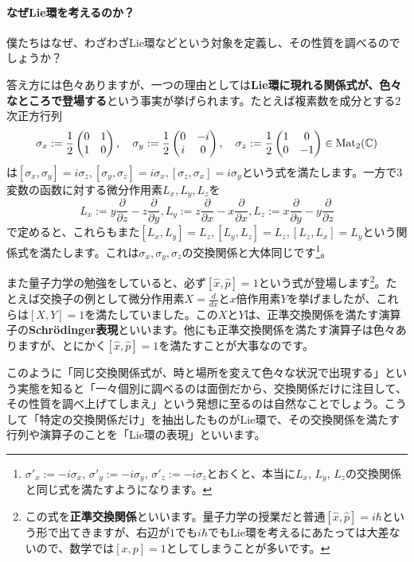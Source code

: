 \paragraph{なぜLie環を考えるのか？}

僕たちはなぜ、わざわざLie環などという対象を定義し、その性質を調べるのでしょうか？

答え方には色々ありますが、一つの理由としては\textbf{Lie環に現れる関係式が、色々なところで登場する}という事実が挙げられます。たとえば複素数を成分とする$2$次正方行列
\[
\sigma_x := 
\frac{1}{2}
\begin{pmatrix}
0 & 1 \\
1 & 0
\end{pmatrix}, \quad
\sigma_y := 
\frac{1}{2}
\begin{pmatrix}
0 & -i \\
i & 0 
\end{pmatrix}, \quad
\sigma_z := 
\frac{1}{2}
\begin{pmatrix}
1 & 0 \\
0 & -1
\end{pmatrix}
\in \operatorname{Mat}_2(\mathbb{C})
\]
は$[\sigma_x, \sigma_y] = i\sigma_z, [\sigma_y, \sigma_z] = i\sigma_x, [\sigma_z, \sigma_x] = i\sigma_y$という式を満たします。一方で$3$変数の函数に対する微分作用素$L_x, L_y, L_z$を
\[
L_x := y\frac{\partial}{\partial z} - z\frac{\partial}{\partial y}, 
L_y := z\frac{\partial}{\partial x} - x\frac{\partial}{\partial x}, 
L_z := x\frac{\partial}{\partial y} - y\frac{\partial}{\partial z}
\]
で定めると、これらもまた$[L_x, L_y] = L_z, [L_y, L_z] = L_z, [L_z, L_x] = L_y$という関係式を満たします。これは$\sigma_x, \sigma_y, \sigma_z$の交換関係と大体同じです\footnote{$\sigma'_x := -i\sigma_x$, $\sigma'_y := -i\sigma_y$, $\sigma'_z := -i\sigma_z$とおくと、本当に$L_x$, $L_y$, $L_z$の交換関係と同じ式を満たすようになります。}。

また量子力学の勉強をしていると、必ず$[\hat{x}, \hat{p}] = 1$という式が登場します\footnote{この式を\textbf{正準交換関係}といいます。量子力学の授業だと普通$[\hat{x}, \hat{p}] = i\hbar$という形で出てきますが、右辺が$1$でも$i\hbar$でもLie環を考えるにあたっては大差ないので、数学では$[x, p] = 1$としてしまうことが多いです。}。たとえば交換子の例として微分作用素$X = \frac{d}{dx}$と$x$倍作用素$Y$を挙げましたが、これらは$[X, Y] = 1$を満たしていました。この$X$と$Y$は、正準交換関係を満たす演算子の\textbf{Schr\"odinger表現}といいます。他にも正準交換関係を満たす演算子は色々ありますが、とにかく$[\hat{x}, \hat{p}] = 1$を満たすことが大事なのです。

このように「同じ交換関係式が、時と場所を変えて色々な状況で出現する」という実態を知ると「一々個別に調べるのは面倒だから、交換関係だけに注目して、その性質を調べ上げてしまえ」という発想に至るのは自然なことでしょう。こうして「特定の交換関係だけ」を抽出したものがLie環で、その交換関係を満たす行列や演算子のことを「Lie環の表現」といいます。


